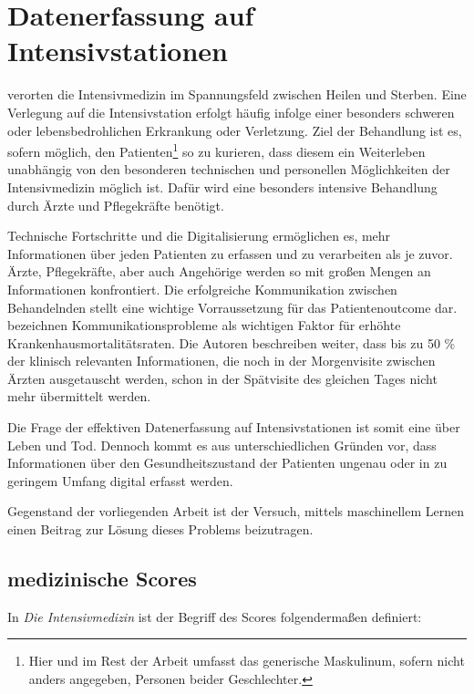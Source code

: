 \section{Datenerfassung auf Intensivstationen}
\cite{marxIntensivmedizin2015c} verorten die Intensivmedizin im Spannungsfeld zwischen Heilen und Sterben. Eine Verlegung auf die Intensivstation erfolgt häufig infolge einer besonders schweren oder lebensbedrohlichen Erkrankung oder Verletzung. 
Ziel der Behandlung ist es, sofern möglich, den Patienten\footnote{Hier und im Rest der Arbeit umfasst das generische Maskulinum, sofern nicht anders angegeben, Personen beider Geschlechter.} so zu kurieren, dass diesem ein Weiterleben unabhängig von den besonderen technischen und personellen Möglichkeiten der Intensivmedizin möglich ist. Dafür wird eine besonders intensive Behandlung durch Ärzte und Pflegekräfte benötigt.

Technische Fortschritte und die Digitalisierung ermöglichen es, mehr Informationen über jeden Patienten zu erfassen und zu verarbeiten als je zuvor. Ärzte, Pflegekräfte, aber auch Angehörige werden so mit großen Mengen an Informationen konfrontiert. Die erfolgreiche Kommunikation zwischen Behandelnden stellt eine wichtige Vorraussetzung für das Patientenoutcome dar. \cite{marxIntensivmedizin2015c} bezeichnen Kommunikationsprobleme als wichtigen Faktor für erhöhte Krankenhausmortalitätsraten. Die Autoren beschreiben weiter, dass bis zu 50 \% der klinisch relevanten Informationen, die noch in der Morgenvisite zwischen Ärzten ausgetauscht werden, schon in der Spätvisite des gleichen Tages nicht mehr übermittelt werden. %

Die Frage der effektiven Datenerfassung auf Intensivstationen ist somit eine über Leben und Tod. Dennoch kommt es aus unterschiedlichen Gründen vor, dass Informationen über den Gesundheitszustand der Patienten ungenau oder in zu geringem Umfang digital erfasst werden. 

Gegenstand der vorliegenden Arbeit ist der Versuch, mittels maschinellem Lernen einen Beitrag zur Lösung dieses Problems beizutragen.

\subsection{medizinische Scores} \label{section:scores}

In \textit{Die Intensivmedizin} \citep{marxIntensivmedizin2015c} ist der Begriff des Scores folgendermaßen definiert:

